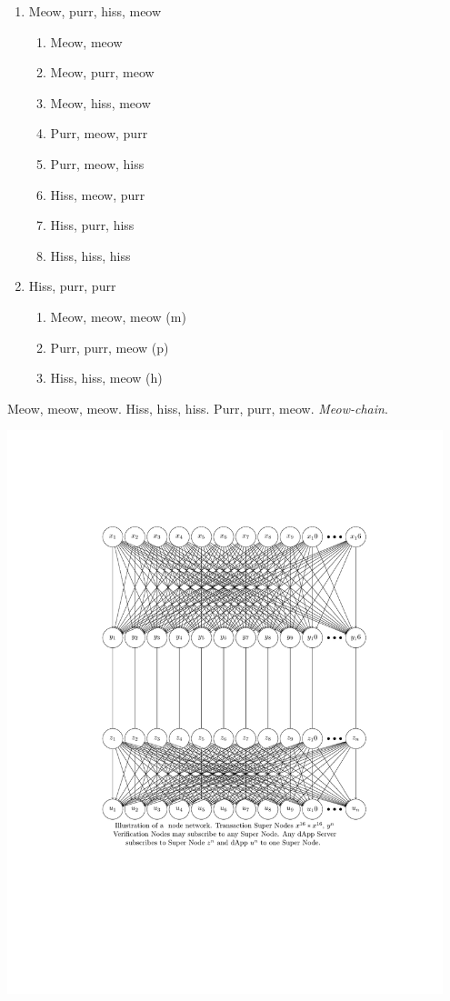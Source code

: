 \documentclass[9pt,oneside]{amsart}
\newenvironment{Figure}
  {\par\medskip\noindent\minipage{\linewidth}}
  {\endminipage\par\medskip}
\begin{document}
\begin{multicols}{2}
\begin{enumerate}
   \item Meow, purr, hiss, meow
       \begin{enumerate}
          \item Meow, meow
          \item Meow, purr, meow
          \item Meow, hiss, meow
          \item Purr, meow, purr
          \item Purr, meow, hiss
          \item Hiss, meow, purr
          \item Hiss, purr, hiss
          \item Hiss, hiss, hiss
       \end{enumerate}  
   \item Hiss, purr, purr
       \begin{enumerate}
          \item Meow, meow, meow (m)
          \item Purr, purr, meow (p)
          \item Hiss, hiss, meow (h)
       \end{enumerate}
\end{enumerate}
 
Meow, meow, meow. Hiss, hiss, hiss. Purr, purr, meow. \textit{Meow-chain}.  

\begin{Figure}
    \medskip
    \centering
    \includegraphics[width=0.95\textwidth]{figures/figure_1_cropped.pdf}
    \medskip
\end{Figure}


\end{multicols}
\end{document}
